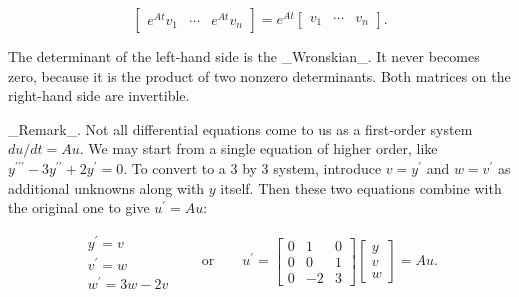 \[\begin{bmatrix}e^{At}v_{1}&\cdots&e^{At}v_{n}\end{bmatrix}=e^{At}\begin{bmatrix} v_{1}&\cdots&v_{n}\end{bmatrix}.\]

The determinant of the left-hand side is the _Wronskian_. It never becomes zero, because it is the product of two nonzero determinants. Both matrices on the right-hand side are invertible.

_Remark_. Not all differential equations come to us as a first-order system \(du/dt=Au\). We may start from a single equation of higher order, like \(y^{\prime\prime\prime}-3y^{\prime\prime}+2y^{\prime}=0\). To convert to a 3 by 3 system, introduce \(v=y^{\prime}\) and \(w=v^{\prime}\) as additional unknowns along with \(y\) itself. Then these two equations combine with the original one to give \(u^{\prime}=Au\):

\[\begin{array}{l}y^{\prime}=v\\ v^{\prime}=w\\ w^{\prime}=3w-2v\end{array}\qquad\text{or}\qquad u^{\prime}=\begin{bmatrix}0&1& 0\\ 0&0&1\\ 0&-2&3\end{bmatrix}\begin{bmatrix}y\\ v\\ w\end{bmatrix}=Au.\] 